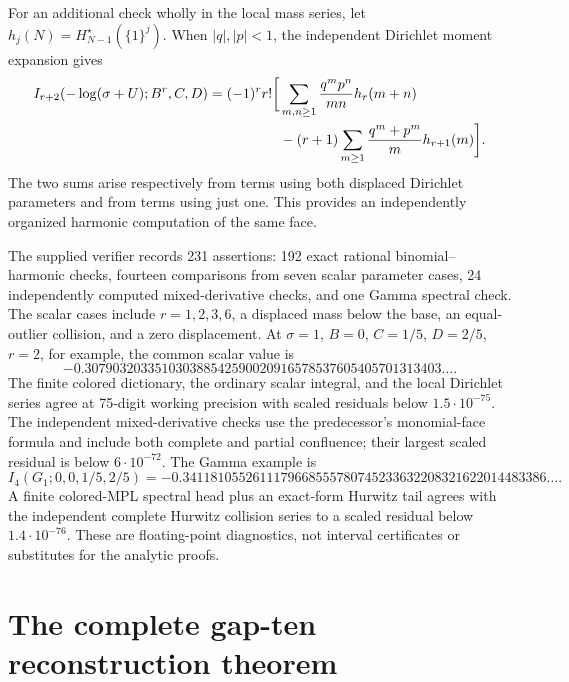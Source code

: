 \documentclass[11pt,a4paper]{article}
\theoremstyle{definition}
\theoremstyle{remark}
\numberwithin{equation}{section}
\begin{document}
For an additional check wholly in the local mass series, let
$h_j(N)=H_{N-1}^{\star}(\{1\}^j)$. When $|q|,|p|<1$,
the independent Dirichlet moment expansion gives
\begin{align}\label{tri:eq:collision-check}
 I_{r+2}(-\log(\sigma+U);B^r,C,D)
 =(-1)^r r!\bigg[&\sum_{m,n\ge1}\frac{q^mp^n}{mn}h_r(m+n)\notag\\
 &-(r+1)\sum_{m\ge1}\frac{q^m+p^m}{m}h_{r+1}(m)\bigg].
\end{align}
The two sums arise respectively from terms using both displaced
Dirichlet parameters and from terms using just one. This provides
an independently organized harmonic computation of the same face.

The supplied verifier records 231 assertions: 192 exact rational
binomial--harmonic checks, fourteen comparisons from seven scalar
parameter cases, 24 independently computed mixed-derivative checks,
and one Gamma spectral check. The scalar cases include
$r=1,2,3,6$, a displaced mass below the base, an equal-outlier
collision, and a zero displacement. At $\sigma=1$, $B=0$,
$C=1/5$, $D=2/5$, $r=2$, for example, the common scalar value is
\[
 -0.307903203351030388542590020916578537605405701313403\ldots.
\]
The finite colored dictionary, the ordinary scalar integral, and
the local Dirichlet series agree at 75-digit working precision
with scaled residuals below $1.5\cdot10^{-75}$. The independent
mixed-derivative checks use the predecessor's monomial-face
formula and include both complete and partial confluence; their
largest scaled residual is below $6\cdot10^{-72}$.
The Gamma example is
\begin{equation}\label{tri:eq:Gamma-value}
 I_4(G_1;0,0,1/5,2/5)
  =-0.3411810552611179668555780745233632208321622014483386\ldots.
\end{equation}
A finite colored-MPL spectral head plus an exact-form Hurwitz
tail agrees with the independent complete Hurwitz collision
series to a scaled residual below $1.4\cdot10^{-76}$.
These are floating-point diagnostics, not interval certificates
or substitutes for the analytic proofs.

\section{The complete gap-ten reconstruction theorem}
\label{gt:section}
\end{document}
